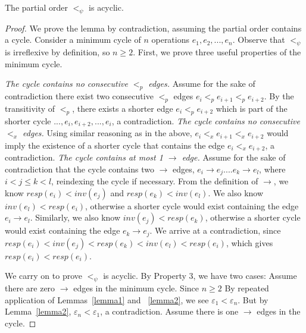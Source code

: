 \begin{lemma}
\label{lemmamain}
The partial order $<_\psi$ is acyclic.
\end{lemma}
\begin{proof}
We prove the lemma by contradiction, assuming the partial order contains a cycle. Consider a minimum cycle of $n$ operations $e_1,e_2,...,e_n$. Observe that $<_\psi$ is irreflexive by definition, so $n \geq 2$. First, we prove three useful properties of the minimum cycle.

 \textit{The cycle contains no consecutive $<_p$ edges.} {Assume for the sake of contradiction there exist two consecutive $<_p$ edges $e_i <_p e_{i+1} <_p e_{i+2}$. By the transitivity of $<_p$, there exists a shorter edge $e_i <_p e_{i+2}$ which is part of the shorter cycle $..., e_i, e_{i+2}, ..., e_i$, a contradiction.}
 \textit{The cycle contains no consecutive $<_x$ edges.} {Using similar reasoning as in the above, $e_i <_x e_{i+1} <_x e_{i+2}$ would imply the existence of a shorter cycle that contains the edge $e_i <_x e_{i+2}$, a contradiction.}
 \textit{The cycle contains at most 1 $\rightarrow$ edge.} Assume for the sake of contradiction that the cycle contains two $\rightarrow$ edges, $e_i \rightarrow e_j .... e_k \rightarrow e_l$, where $i < j \leq k < l$, reindexing the cycle if necessary. From the definition of $\rightarrow$, we know $resp(e_i) < inv(e_j)$ and $resp(e_k) < inv(e_l)$. We also know $inv(e_l) < resp(e_i)$, otherwise a shorter cycle would exist containing the edge $e_i \rightarrow e_l$. Similarly, we also know $inv(e_j) < resp(e_k)$, otherwise a shorter cycle would exist containing the edge $e_k \rightarrow e_j$. We arrive at a contradiction, since $resp(e_i) < inv(e_j) < resp(e_k) < inv(e_l) < resp(e_i)$, which gives $resp(e_i) < resp(e_i)$.

We carry on to prove $<_\psi$ is acyclic. By Property 3, we have two cases:
 Assume there are zero $\rightarrow$ edges in the minimum cycle. Since $n \geq 2$
By repeated application of Lemmas~\ref{lemma1} and ~\ref{lemma2}, we see $\varepsilon_1 < \varepsilon_n$. But by Lemma~\ref{lemma2}, $\varepsilon_n < \varepsilon_1$, a contradiction.
 Assume there is one $\rightarrow$ edges in the cycle.

\end{proof}